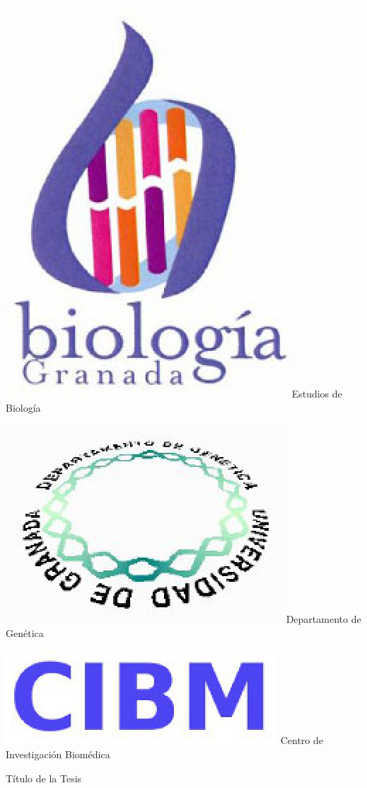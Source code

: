 \documentclass[b5paper,twoside,10pt]{book}
\begin{document}
\begin{minipage}[b]{.23\textwidth}
\centering
\includegraphics[width=.7\textwidth]{biologia.eps}
Estudios de Biolog\'ia
\end{minipage}
\hfill
\begin{minipage}[b]{.23\textwidth}
\centering
\includegraphics[width=.7\textwidth]{genetica.eps}
Departamento de Gen\'etica
\end{minipage}
\hfill
\begin{minipage}[b]{.23\textwidth}
\centering
\includegraphics[width=.7\textwidth]{cibm.eps}
Centro de Investigaci\'on Biom\'edica
\end{minipage}
\vfill
\begin{center}
\LARGE
Título de la Tesis

\end{center}
\vfill
\end{document}
